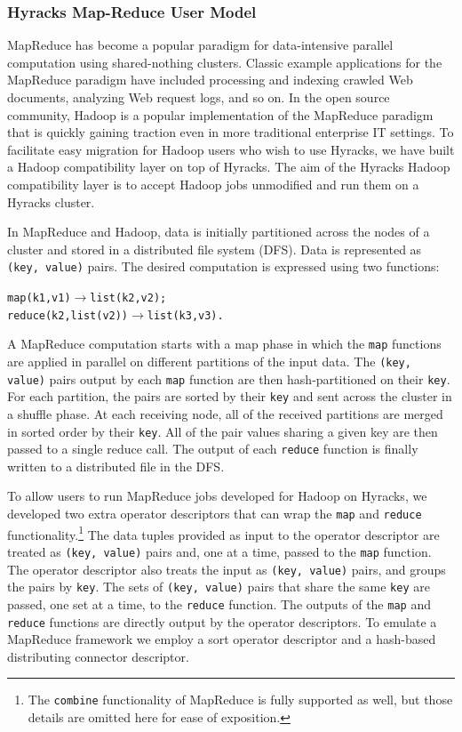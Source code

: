 \subsubsection{Hyracks Map-Reduce User Model}

MapReduce has become a popular paradigm for data-intensive parallel computation using shared-nothing clusters.
Classic example applications for the MapReduce paradigm have included processing and indexing crawled Web documents, analyzing Web request logs, and so on.
In the open source community, Hadoop is a popular implementation of the MapReduce paradigm that is quickly gaining traction even in more traditional enterprise IT settings.
To facilitate easy migration for Hadoop users who wish to use Hyracks, we have built a Hadoop compatibility layer on top of Hyracks.
The aim of the Hyracks Hadoop compatibility layer is to accept Hadoop jobs unmodified and run them on a Hyracks cluster.

In MapReduce and Hadoop, data is initially partitioned across the nodes of a cluster and stored in a distributed file system (DFS).
Data is represented as \texttt{(key, value)} pairs.
The desired computation is expressed using two functions:
\begin{alltt}
map    (k1,v1)       \(\rightarrow\) list(k2,v2);
reduce (k2,list(v2)) \(\rightarrow\) list(k3,v3).
\end{alltt}

A MapReduce computation starts with a map phase in which the \texttt{map} functions are applied in parallel on different partitions of the input data.
The \texttt{(key, value)} pairs output by each \texttt{map} function are then hash-partitioned on their \texttt{key}.
For each partition, the pairs are sorted by their \texttt{key} and sent across the cluster in a shuffle phase.
At each receiving node, all of the received partitions are merged in sorted order by their \texttt{key}.
All of the pair values sharing a given key are then passed to a single reduce call.
The output of each \texttt{reduce} function is finally written to a distributed file in the DFS.

To allow users to run MapReduce jobs developed for Hadoop on Hyracks, we developed two extra operator descriptors that can wrap the
\texttt{map} and \texttt{reduce} functionality.\footnote{The \texttt{combine} functionality of MapReduce is fully supported as well,
but those details are omitted here for ease of exposition.} 
The data tuples provided as input to the  operator descriptor are treated as \texttt{(key, value)} pairs and,
one at a time, passed to the \texttt{map} function.
The  operator descriptor also treats the input as \texttt{(key, value)} pairs, and groups the pairs by \texttt{key}.
The sets of \texttt{(key, value)} pairs that share the same \texttt{key} are passed, one set at a time, to the \texttt{reduce} function.
The outputs of the \texttt{map} and \texttt{reduce} functions are directly output by the operator descriptors.
To emulate a MapReduce framework we employ a sort operator descriptor and a hash-based distributing connector descriptor.


